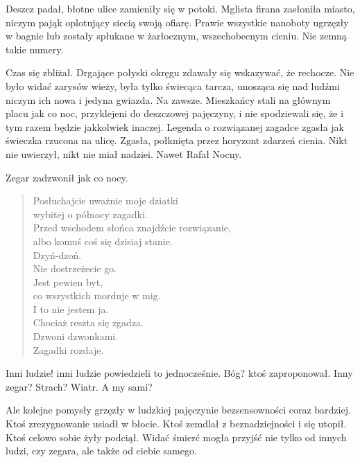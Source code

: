 Deszcz padał, błotne ulice zamieniły się w potoki.
Mglista firana zasłoniła miasto, niczym pająk oplotujący siecią swoją ofiarę.
Prawie wszystkie nanoboty ugrzęzły w bagnie lub zostały spłukane w żarłocznym, wszechobecnym cieniu.
Nie zemną takie numery.

Czas się zbliżał.
Drgające połyski okręgu zdawały się wskazywać, że rechocze.
Nie było widać zarysów wieży, była tylko świecąca tarcza, unosząca się nad ludźmi niczym ich nowa i jedyna gwiazda.
Na zawsze.
Mieszkańcy stali na głównym placu jak co noc, przyklejeni do deszczowej pajęczyny, i nie spodziewali się, że i tym razem będzie jakkolwiek inaczej.
Legenda o rozwiązanej zagadce zgasła jak świeczka rzucona na ulicę. 
Zgasła, połknięta przez horyzont zdarzeń cienia.
Nikt nie uwierzył, nikt nie miał nadziei.
Nawet Rafał Nocny.

Zegar zadzwonił jak co nocy.

\begin{sl}
\begin{quote}
Posłuchajcie uważnie moje dziatki \\
wybitej o północy zagadki. \\
Przed wschodem słońca znajdźcie rozwiązanie, \\
albo komuś coś się dzisiaj stanie. \\
Dzyń-dzoń. \\
Nie dostrzeżecie go. \\
Jest pewien byt, \\
co wszystkich morduje w mig. \\
I to nie jestem ja. \\
Chociaż reszta się zgadza. \\
Dzwoni dzwonkami. \\
Zagadki rozdaje. \\
\end{quote}
\end{sl}

\begin{dialogue}
	\ds{} Inni ludzie! \dm{} inni ludzie powiedzieli to jednocześnie.
	\ds{} Bóg? \dm{} ktoś zaproponował.
	\ds{} Inny zegar?
	\ds{} Strach?
	\ds{} Wiatr.
	\ds{} A my sami?
\end{dialogue}
Ale kolejne pomysły grzęzły w ludzkiej pajęczynie bezsensowności coraz bardziej.
Ktoś zrezygnowanie usiadł w błocie.
Ktoś zemdlał z beznadziejności i się utopił.
Ktoś celowo sobie żyły podciął.
Widać śmierć mogła przyjść nie tylko od innych ludzi, czy zegara, ale także od ciebie samego.

